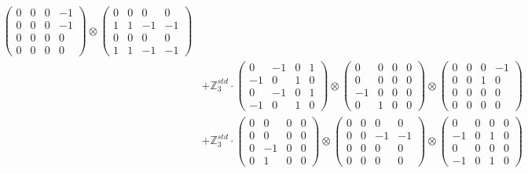 \documentclass{article}
\begin{document}
{\begin{align}
            \begin{pmatrix} 0 & 0 & 0 & -1 \\ 0 & 0 & 0 & -1 \\ 0 & 0 & 0 & 0 \\ 0 & 0 & 0 & 0 \end{pmatrix} \otimes 
            \begin{pmatrix} 0 & 0 & 0 & 0 \\ 1 & 1 & -1 & -1 \\ 0 & 0 & 0 & 0 \\ 1 & 1 & -1 & -1 \end{pmatrix} \\ 
        &+ \label{Rs16-Rc11-Solution-2-c20} \mathbb{Z}_3^{std} \cdot 
            \begin{pmatrix} 0 & -1 & 0 & 1 \\ -1 & 0 & 1 & 0 \\ 0 & -1 & 0 & 1 \\ -1 & 0 & 1 & 0 \end{pmatrix} \otimes 
            \begin{pmatrix} 0 & 0 & 0 & 0 \\ 0 & 0 & 0 & 0 \\ -1 & 0 & 0 & 0 \\ 0 & 1 & 0 & 0 \end{pmatrix} \otimes 
            \begin{pmatrix} 0 & 0 & 0 & -1 \\ 0 & 0 & 1 & 0 \\ 0 & 0 & 0 & 0 \\ 0 & 0 & 0 & 0 \end{pmatrix} \\ 
        &+ \label{Rs16-Rc11-Solution-2-c21} \mathbb{Z}_3^{std} \cdot 
            \begin{pmatrix} 0 & 0 & 0 & 0 \\ 0 & 0 & 0 & 0 \\ 0 & -1 & 0 & 0 \\ 0 & 1 & 0 & 0 \end{pmatrix} \otimes 
            \begin{pmatrix} 0 & 0 & 0 & 0 \\ 0 & 0 & -1 & -1 \\ 0 & 0 & 0 & 0 \\ 0 & 0 & 0 & 0 \end{pmatrix} \otimes 
            \begin{pmatrix} 0 & 0 & 0 & 0 \\ -1 & 0 & 1 & 0 \\ 0 & 0 & 0 & 0 \\ -1 & 0 & 1 & 0 \end{pmatrix} \\ 

\end{align}}
\end{document}
